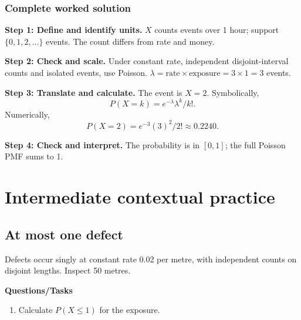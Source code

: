 \subsubsection*{Complete worked solution}
\par\noindent\begin{minipage}{\linewidth}
\textbf{Step 1: Define and identify units.} $X$ counts events over 1 hour; support $\{0,1,2,\ldots\}$ events. The count differs from rate and money.
\end{minipage}\par\medskip
\par\noindent\begin{minipage}{\linewidth}
\textbf{Step 2: Check and scale.} Under constant rate, independent disjoint-interval counts and isolated events, use Poisson. $\lambda=\text{rate}\times\text{exposure}=3\times1=3$ events.
\end{minipage}\par\medskip
\par\noindent\begin{minipage}{\linewidth}
\textbf{Step 3: Translate and calculate.} The event is $ X=2$. Symbolically,
\[P(X=k)=e^{-\lambda}\lambda^k/k!.\]
Numerically,
\[P(X=2)=e^{-3}(3)^2/2!\approx 0.2240.\]
\end{minipage}\par\medskip
\par\noindent\begin{minipage}{\linewidth}
\textbf{Step 4: Check and interpret.} The probability is in $[0,1]$; the full Poisson PMF sums to 1. 
\end{minipage}\par\medskip
{}
\section{Intermediate contextual practice}\label{sec:t2-c7-intermediate}
\subsection{At most one defect}
Defects occur singly at constant rate 0.02 per metre, with independent counts on disjoint lengths. Inspect 50 metres.

\textbf{Questions/Tasks}
\begin{enumerate}
\item Calculate $P(X\leq1)$ for the exposure. 
\end{enumerate}
